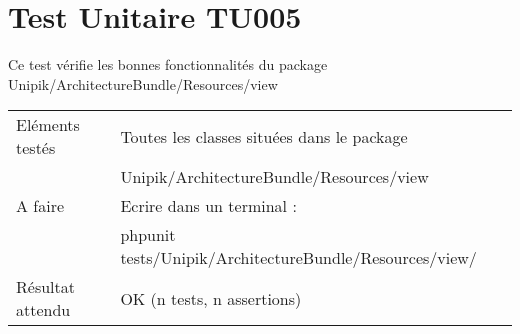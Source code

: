 \section{Test Unitaire TU005}

		Ce test vérifie les bonnes fonctionnalités du package Unipik/ArchitectureBundle/Resources/view \\
		
		
  		\begin{center}
    	 		\begin{tabular}[h]{|p{}|p{}|}
			\hline
				Eléments testés & Toutes les classes situées dans le package \\ 																& Unipik/ArchitectureBundle/Resources/view \\\hline
    				A faire & Ecrire dans un terminal : \\ 
    						& phpunit tests/Unipik/ArchitectureBundle/Resources/view/\\\hline
    				Résultat attendu & OK (n tests, n assertions) \\\hline
     		\end{tabular}
  		\end{center}	
  	